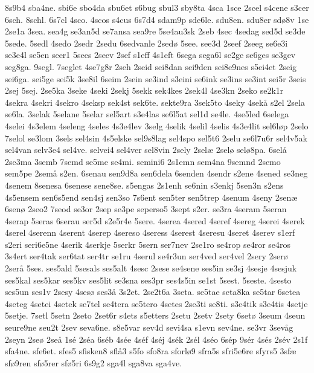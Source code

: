 {8s9b4
sba4ne.
sbi6e
sbo4da
sbu6et
s6bug
sbul3
sby8ta
4sca
1sce
2scel
s4cene
s3cer
6sch.
8schl.
6s7cl
4sco.
4scos
s4cus
6s7d4
sdam9p
sde6le.
sdu8en.
sdu8er
sd^^f88v
1se
2se1a
3sea.
sea4g
se3an5d 
se7ansa
sea9re
5se4au3sk
2seb
4sec
4sedag
sed5d
se3de
5sede.
5sedl
4sedo
2sedr
2sedu
6sedvanle
2sed^^f8
5see.
see3d
2seef
2seeg
se6e3i
se3e4l
se5en
seer1
5sees
2seev
2sef
s1eff
4s1eft
6sega
sega6l
se2ge
se6ges
se3gev
seg8ga.
9segl.
7seglet
4se7g8r
2seh
2seid
sei8dan
sei9den
sei8e9nes
s5ei4et
2seig
sei6ga.
sei5ge
sei5k
3se8il
6seim
2sein
se3ind
s3eini
se6ink
se3ins
se3int
sei5r
3seis
2sej
5sej.
2se5ka
3seke
4seki
2sekj
5sekk
sek4kes
2sek4l
4se3kn
2seko
se2k1r
4sekra
4sekri
4sekro
4seksp
sek4st
sek6te.
sekte9ra
3sek5to
4seky
4sek^^e5
s2el
2sela
se6la.
3selak
5selane
5selar
sel5art
s3e4las
se6l5at
sel1d
se4le.
4se5led
6selega
4selei
4s3elem
4seleng
4seles
4s3e4lev
3selg
4selik
4selil
4selis
4s3e4lit
sel6l^^f8p
2selo
7selol
se3lom
3sels
sel4sin
4s5elske
sel9s8lag
sel4spo
sel5t6
2selu
se6l7u6r
sel4v5ak
sel4van
selv3e4
sel4ve.
selvei4
sel4ver
sel8vin
2sely
2sel^^e6
2sel^^f8
sel^^f88pa.
6sel^^e5
2se3ma
3semb
7semd
se5me
se4mi.
semini6
2s1emn
sem4na
9semnd
2semo
sem5pe
2sem^^e5
s2en.
6senau
sen9d8a
sen6dela
6senden
4sendr
s2ene
4sened
se3neg
4senem
8senesa
6senese
sene8se.
s5engas
2s1enh
se6nin
s3enkj
5sen3n
s2ens
4s5ensem
sen6s5end
sen4sj
sen3so
7s6ent
sen5ter
sen5trep
4senum
4seny
2sen^^e6
6sen^^f8
2seo2
7seod
se3or
2sep
se3pe
seperso5
3sept
s2er.
se3ra
4seram
5seran
4serap
5seras
6serau
ser5d
s2e5r4e
5sere.
4serea
4sered
4seref
4sereg
4serei
4serek
4serel
4serenn
4serent
4serep
4sereso
4seress
4serest
4seresu
4seret
4serev
s1erf
s2eri
seri6e5ne
4serik
4serkje
5serkr
5sern
ser7nev
2se1ro
se4rop
se4ror
se4ros
3s4ert
ser4tak
ser6tat
ser4tr
se1ru
4serul
se4r3un
ser4ved
ser4vel
2sery
2ser^^f8
2ser^^e5
5ses.
ses5ald
5sesals
ses5alt
4sesc
2sese
se4sene
ses5in
se3sj
4sesje
4sesjuk
ses5kal
ses5kar
ses5kv
ses5lit
se3sna
ses3pr
ses4s5in
se1st
5sest.
5seste.
4sesto
ses5un
ses1v
2sesy
4ses^^f8
ses3^^e5
3s2et.
2se2t6a
3seta.
se5tae
seta8ka
se5tar
6setea
4seteg
4setei
4setek
se7tel
se4tera
se5tero
4setes
2se3ti
se8ti.
s3e4tik
s3e4tis
4setje
5setje.
7setl
5setn
2seto
2set6r
s4ets
s5etters
2setu
2setv
2sety
6set^^f8
3seum
4seun
seure9ne
seu2t
2sev
seva6ne.
s8e5var
sev4d
sevi4sa
s1evn
sev4ne.
se3vr
3sev^^e5g
2seyn
2se^^f8
2se^^e5
1s^^e9
2s^^e9a
6s^^e9b
4s^^e9e
4s^^e9f
4s^^e9j
4s^^e9k
2s^^e9l
4s^^e9o
6s^^e9p
9s^^e9r
4s^^e9s
2s^^e9v
2s1f
sfa4ne.
sfe6et.
sfes5
sfisken8
sfl^^e53
s5fo
sfo8ra
sforl^^f89
sfra5s
sfri5e6re
sfyrs5
3sf^^e6
sf^^f89ren
sf^^f85rer
sf^^f85ri
6s9g2
sga4l
sga8va
sga4ve.
}
